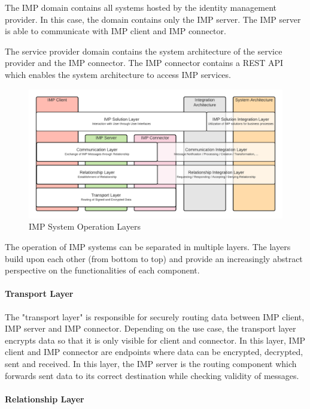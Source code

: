 The IMP domain contains all systems hosted by the identity management provider. In this case, the domain contains only the IMP server. The IMP server is able to communicate with IMP client and IMP connector.

The service provider domain contains the system architecture of the service provider and the IMP connector. The IMP connector contains a REST API which enables the system architecture to access IMP services.

\begin{figure}[h]
\caption{IMP System Operation Layers}
    \centering
    \includegraphics[scale=0.3]{Diagrams/IMP Layer Diagram.png}
\end{figure}

The operation of IMP systems can be separated in multiple layers. The layers build upon each other (from bottom to top) and provide an increasingly abstract perspective on the functionalities of each component.

\paragraph{Transport Layer}

The "transport layer" is responsible for securely routing data between IMP client, IMP server and IMP connector. Depending on the use case, the transport layer encrypts data so that it is only visible for client and connector. In this layer, IMP client and IMP connector are endpoints where data can be encrypted, decrypted, sent and received. In this layer, the IMP server is the routing component which forwards sent data to its correct destination while checking validity of messages.

\paragraph{Relationship Layer}

